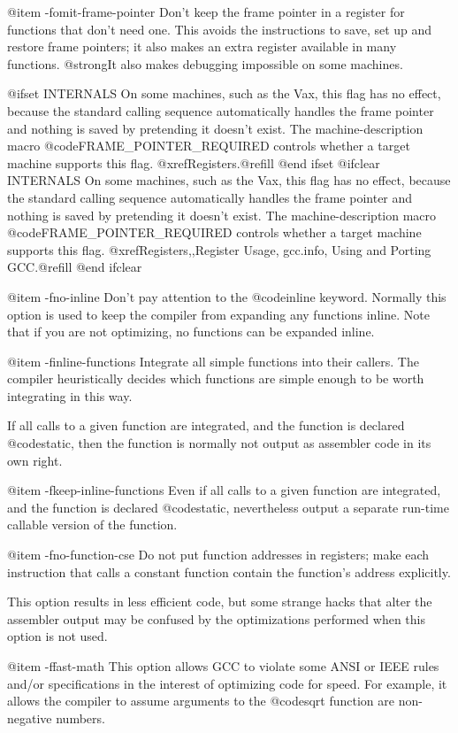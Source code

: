 {@item -fomit-frame-pointer
Don't keep the frame pointer in a register for functions that
don't need one.  This avoids the instructions to save, set up and
restore frame pointers; it also makes an extra register available
in many functions.  @strong{It also makes debugging impossible on
some machines.}

@ifset INTERNALS
On some machines, such as the Vax, this flag has no effect, because
the standard calling sequence automatically handles the frame pointer
and nothing is saved by pretending it doesn't exist.  The
machine-description macro @code{FRAME_POINTER_REQUIRED} controls
whether a target machine supports this flag.  @xref{Registers}.@refill
@end ifset
@ifclear INTERNALS
On some machines, such as the Vax, this flag has no effect, because
the standard calling sequence automatically handles the frame pointer
and nothing is saved by pretending it doesn't exist.  The
machine-description macro @code{FRAME_POINTER_REQUIRED} controls
whether a target machine supports this flag.  @xref{Registers,,Register
Usage, gcc.info, Using and Porting GCC}.@refill
@end ifclear

@item -fno-inline
Don't pay attention to the @code{inline} keyword.  Normally this option
is used to keep the compiler from expanding any functions inline.
Note that if you are not optimizing, no functions can be expanded inline.

@item -finline-functions
Integrate all simple functions into their callers.  The compiler
heuristically decides which functions are simple enough to be worth
integrating in this way.

If all calls to a given function are integrated, and the function is
declared @code{static}, then the function is normally not output as
assembler code in its own right.

@item -fkeep-inline-functions
Even if all calls to a given function are integrated, and the function
is declared @code{static}, nevertheless output a separate run-time
callable version of the function.

@item -fno-function-cse
Do not put function addresses in registers; make each instruction that
calls a constant function contain the function's address explicitly.

This option results in less efficient code, but some strange hacks
that alter the assembler output may be confused by the optimizations
performed when this option is not used.

@item -ffast-math
This option allows GCC to violate some ANSI or IEEE rules and/or
specifications in the interest of optimizing code for speed.  For
example, it allows the compiler to assume arguments to the @code{sqrt}
function are non-negative numbers.

}
